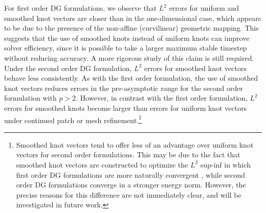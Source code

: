 \documentclass[preprint,10pt]{elsarticle}
\newcommand{\reviewerOne}[1]{#1}
\begin{document}
For first order DG formulations, we observe that $L^2$ errors for uniform and smoothed knot vectors are closer \reviewerOne{than in} the one-dimensional case, which appears to be due to \reviewerOne{the presence of the non-affine (curvilinear) geometric mapping}.  \reviewerOne{This suggests that the use of smoothed knots instead of uniform knots can improve solver efficiency, since it is possible to take a larger maximum stable timestep without reducing accuracy.  A more rigorous study of this claim is still required.}  Under the second order DG formulation, $L^2$ errors for smoothed knot vectors behave less consistently.  As with the first order formulation, the use of smoothed knot vectors reduces errors in the pre-asymptotic range for the second order formulation with $p > 2$.  However, in contrast with the first order formulation, $L^2$ errors for smoothed knots become larger than errors for uniform knot vectors under continued patch or mesh refinement.\footnote{Smoothed knot vectors tend to offer less of an advantage over uniform knot vectors for second order formulations.  This may be due to the fact that smoothed knot vectors are constructed to optimize the $L^2$ sup-inf in which first order DG formulations are more naturally convergent  \cite{warburton2013low, chan2016weight1}, while second order DG formulations converge in a stronger energy norm.  However, the precise reasons for this difference are not immediately clear, and will be investigated in future work.}
\end{document}
